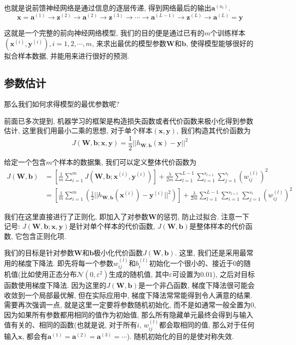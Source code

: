 \documentclass[a4paper,UTF8]{ctexart}
\theoremstyle{plain} \newtheorem{theorem}{定理}[section]
\theoremstyle{plain} \newtheorem{definition}{定义}[section]
\theoremstyle{plain} \newtheorem{lemma}{引理}[section]
\theoremstyle{plain} \newtheorem{proposition}{命题}[section]
\theoremstyle{plain} \newtheorem{example}{例}[section]
\theoremstyle{plain} \newtheorem{remark}{注}[section]
\theoremstyle{plain} \newtheorem{corollary}{推论}[section]
\begin{document}
也就是说前馈神经网络是通过信息的逐层传递, 得到网络最后的输出$\bm{a}^{(n_l)}$.
\begin{equation*}
\bm{x} = \bm{a}^{(1)} \rightarrow \bm{z}^{(2)} \rightarrow \bm{a}^{(2)} \rightarrow \bm{z}^{(3)} \rightarrow \cdots \rightarrow \bm{a}^{(L - 1)} \rightarrow \bm{z}^{(L)} \rightarrow \bm{a}^{(L)} = \bm{y}
\end{equation*}

这就是一个完整的前向神经网络模型, 我们的目的便是通过已有的$m$个训练样本$(\bm{x}^{(i)}, \bm{y}^{(i)}), i = 1, 2, \cdots, m$, 来求出最优的模型参数$\bm{W}$和$\bm{b}$, 使得模型能够很好的拟合样本数据, 并能用来进行很好的预测.


\subsection{参数估计}
那么我们如何求得模型的最优参数呢?

前面已多次提到, 机器学习的框架是构造损失函数或者代价函数来极小化得到参数估计, 这里我们用最小二乘的思想, 对于单个样本$(\bm{x}, \bm{y})$, 我们构造其代价函数为
\begin{equation*}
J(\bm{W}, \bm{b}; \bm{x}, \bm{y}) = \frac{1}{2} ||h_{\bm{W}, \bm{b}}(\bm{x}) - \bm{y}||^2
\end{equation*}

给定一个包含$m$个样本的数据集, 我们可以定义整体代价函数为
\begin{align*}
J(\bm{W},\bm{b}) & = \left[ \frac{1}{m} \sum_{i=1}^{m} J(\bm{W},\bm{b}; \bm{x}^{(i)},\bm{y}^{(i)}) \right] + \frac{\lambda}{2m} \sum_{l=1}^{L-1} \sum_{i=1}^{s_{l+1}} \sum_{j=1}^{s_{l}} (w_{ij}^{(l)})^2 \\
& = \left[ \frac{1}{m} \sum_{i=1}^{m} \left( \frac{1}{2} ||h_{\bm{W},\bm{b}}(\bm{x}^{(i)}) - \bm{y}^{(i)}||^2 \right) \right] + \frac{\lambda}{2m} \sum_{l=1}^{L-1} \sum_{i=1}^{s_{l+1}} \sum_{j=1}^{s_{l}} (w_{ij}^{(l)})^2
\end{align*}

我们在这里直接进行了正则化, 即加入了对参数$\bm{W}$的惩罚, 防止过拟合. 注意一下记号: $J(\bm{W},\bm{b}; \bm{x},\bm{y})$是针对单个样本的代价函数, $J(\bm{W},\bm{b})$是整体样本的代价函数, 它包含正则化项.

我们的目标是针对参数$\bm{W}$和$\bm{b}$极小化代价函数$J(\bm{W},\bm{b})$. 这里, 我们还是采用最常用的梯度下降法. 即先将每一个参数$w_{ij}^{(l)}$和$b_{i}^{(l)}$初始化一个很小的、接近于$0$的随机值(比如使用正态分布$\mathcal{N}(0, \varepsilon^2)$生成的随机值, 其中$\varepsilon$可设置为$0.01$), 之后对目标函数使用梯度下降法. 因为这里的$J(\bm{W}, \bm{b})$是一个非凸函数, 梯度下降法很可能会收敛到一个局部最优解, 但在实际应用中, 梯度下降法常常能得到令人满意的结果. 需要再次强调一点, 就是这里一定要将参数随机初始化, 而不是如通常一般全置为$0$, 因为如果所有参数都用相同的值作为初始值, 那么所有隐藏单元最终会得到与输入值有关的、相同的函数(也就是说, 对于所有$i$, $w_{ij}^{(l)}$都会取相同的值, 那么对于任何输入$\bm{x}$, 都会有$\bm{a}^{(1)} = \bm{a}^{(2)} = \bm{a}^{(3)} = \cdots$). 随机初始化的目的是使对称失效.
\end{document}
